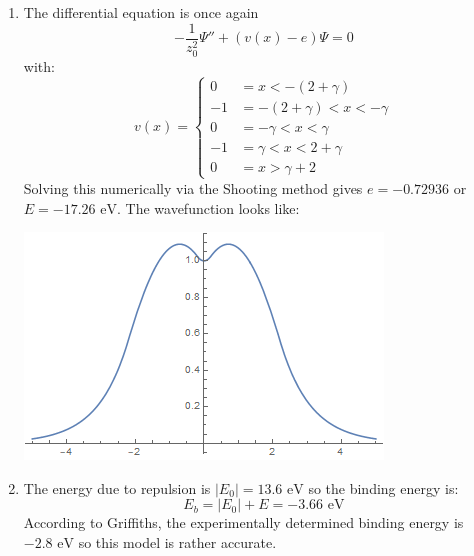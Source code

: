 \newpage
\begin{sol}
\begin{enumerate}[label=\textbf{(\alph*)}]
\item The differential equation is once again
$$-\frac{1}{z_0^2}\Psi''+(v(x)-e)\Psi=0$$
with:
$$
v(x) = \begin{cases}
0 &= x<-(2+\gamma) \\
-1 &= -(2+\gamma)<x<-\gamma \\
0 &= -\gamma < x < \gamma \\
-1 &= \gamma < x < 2+\gamma \\
0 &= x > \gamma+2
\end{cases}
$$
Solving this numerically via the Shooting method gives $e=-0.72936$ or $E=-17.26 \text{ eV}$. The wavefunction looks like:
\begin{center}
    \includegraphics[width=0.4\linewidth]{Images/6-6.png}
\end{center}
\item The energy due to repulsion is $|E_0|=13.6 \text{ eV}$ so the binding energy is:
$$E_b=|E_0|+E=-3.66 \text{ eV}$$
According to Griffiths, the experimentally determined binding energy is $-2.8 \text{ eV}$ so this model is rather accurate.
\end{enumerate}
\end{sol}